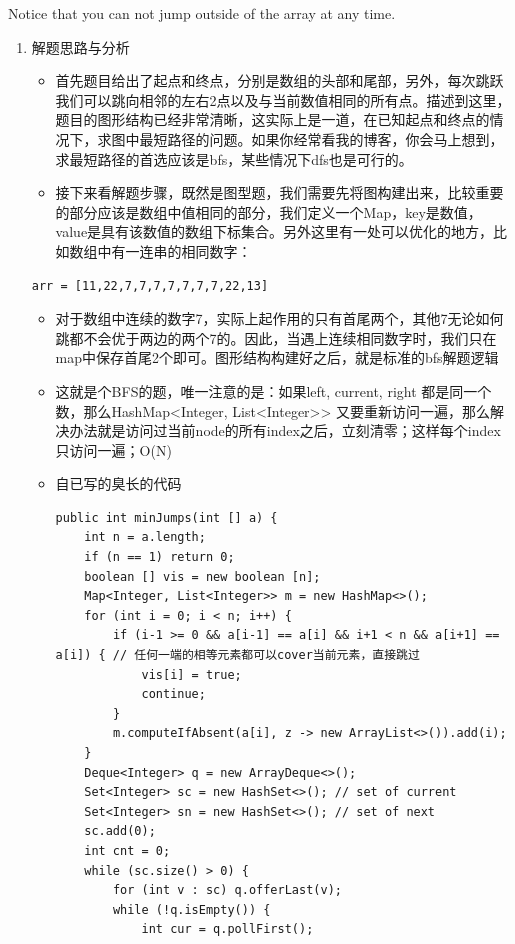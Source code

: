 \documentclass[9pt, b5paaper]{book}
\begin{document}
Notice that you can not jump outside of the array at any time.
\begin{enumerate}
\item 解题思路与分析
\label{sec-3-0-10-1}
\begin{itemize}
\item 首先题目给出了起点和终点，分别是数组的头部和尾部，另外，每次跳跃我们可以跳向相邻的左右2点以及与当前数值相同的所有点。描述到这里，题目的图形结构已经非常清晰，这实际上是一道，在已知起点和终点的情况下，求图中最短路径的问题。如果你经常看我的博客，你会马上想到，求最短路径的首选应该是bfs，某些情况下dfs也是可行的。
\item 接下来看解题步骤，既然是图型题，我们需要先将图构建出来，比较重要的部分应该是数组中值相同的部分，我们定义一个Map，key是数值，value是具有该数值的数组下标集合。另外这里有一处可以优化的地方，比如数组中有一连串的相同数字：
\end{itemize}
\begin{verbatim}
arr = [11,22,7,7,7,7,7,7,7,22,13]
\end{verbatim}
\begin{itemize}
\item 对于数组中连续的数字7，实际上起作用的只有首尾两个，其他7无论如何跳都不会优于两边的两个7的。因此，当遇上连续相同数字时，我们只在map中保存首尾2个即可。图形结构构建好之后，就是标准的bfs解题逻辑
\item 这就是个BFS的题，唯一注意的是：如果left, current, right 都是同一个数，那么HashMap<Integer, List<Integer>> 又要重新访问一遍，那么解决办法就是访问过当前node的所有index之后，立刻清零；这样每个index只访问一遍；O(N)
\item 自已写的臭长的代码
\begin{verbatim}
public int minJumps(int [] a) {
    int n = a.length;
    if (n == 1) return 0;
    boolean [] vis = new boolean [n];
    Map<Integer, List<Integer>> m = new HashMap<>();
    for (int i = 0; i < n; i++) {
        if (i-1 >= 0 && a[i-1] == a[i] && i+1 < n && a[i+1] == a[i]) { // 任何一端的相等元素都可以cover当前元素，直接跳过
            vis[i] = true;
            continue;
        }
        m.computeIfAbsent(a[i], z -> new ArrayList<>()).add(i);
    }
    Deque<Integer> q = new ArrayDeque<>();
    Set<Integer> sc = new HashSet<>(); // set of current
    Set<Integer> sn = new HashSet<>(); // set of next
    sc.add(0);
    int cnt = 0;
    while (sc.size() > 0) {
        for (int v : sc) q.offerLast(v);
        while (!q.isEmpty()) {
            int cur = q.pollFirst();

\end{verbatim}
\end{itemize}
\end{enumerate}
\end{document}
